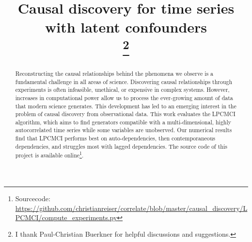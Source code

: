 \documentclass[conference]{IEEEtran}
\begin{document}
\title{Causal discovery for time series with latent confounders\\
\thanks{I thank Paul-Christian Buerkner for helpful discussions and
suggestions.}
}

\author{






}

\maketitle

\begin{abstract}
Reconstructing the causal relationships behind the phenomena we observe is a fundamental challenge in all areas of science.
Discovering causal relationships through experiments is often infeasible, unethical, or expensive in complex systems. 
However, increases in computational power allow us to process the ever-growing amount of data that modern science generates.
This development has led to an emerging interest in the problem of causal discovery from observational data.
This work evaluates the LPCMCI algorithm, which aims to find generators compatible with a multi-dimensional, highly autocorrelated time series while some variables are unobserved.
Our numerical results find that LPCMCI performs best on auto-dependencies, then contemporaneous dependencies, and struggles most with lagged dependencies.
The source code of this project is available online\footnote{Sourcecode: \href{https://github.com/christianreiser/correlate/blob/master/causal_discovery/LPCMCI/compute_experiments.py}{https://github.com/christianreiser/correlate/blob/master/causal\_discovery/LPCMCI/compute\_experiments.py}}.
\end{abstract}
\end{document}
